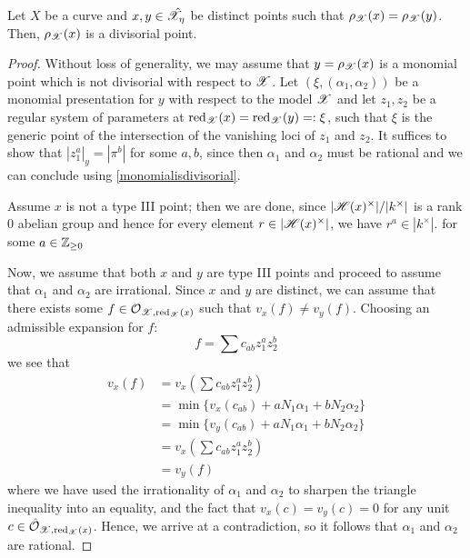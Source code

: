 \begin{prop}\label{lemma:retractiondivisorial}
    Let $X$ be a curve and $x, y \in \hat{\mathscr{X}}_{\eta}$ be distinct points such that $\rho_{\mathscr{X}}(x) = \rho_{\mathscr{X}}(y)$. 
    Then, $\rho_{\mathscr{X}}(x)$ is a divisorial point.
\end{prop}
\begin{proof}
    Without loss of generality, we may assume that $y = \rho_{\mathscr{X}}(x)$ is a monomial point which is not divisorial with respect to $\mathscr{X}$.
    Let $(\xi, (\alpha_1, \alpha_2))$ be a monomial presentation for $y$ with respect to the model $\mathscr{X}$ and let $z_1, z_2$ be a regular system of parameters at $\operatorname{red}_{\mathscr{X}}(x) = \operatorname{red}_{\mathscr{X}}(y) =: \xi$, such that $\xi$ is the generic point of the intersection of the vanishing loci of $z_1$ and $z_2$. 
    It suffices to show that $|z_1^a|_y = |\pi^b|$ for some $a, b$, since then $\alpha_1$ and $\alpha_2$ must be rational and we can conclude using \cref{monomialisdivisorial}.
    
    Assume $x$ is not a type III point; then we are done, since $|\mathscr{H}(x)^{\times}|/|k^{\times}|$ is a rank $0$ abelian group and hence for every element $r \in |\mathscr{H}(x)^{\times}|$, we have $r^a \in |k^{\times}|$. for some $a \in \mathbb{Z}_{\geq 0}$
    
    Now, we assume that both $x$ and $y$ are type III points and proceed to assume that $\alpha_1$ and $\alpha_2$ are irrational.
    Since $x$ and $y$ are distinct, we can assume that there exists some $f \in \mathcal{O}_{\mathscr{X}, \operatorname{red}_{\mathscr{X}}(x)}$ such that $v_x(f) \neq v_y(f)$. 
    Choosing an admissible expansion for $f$:
    \[
        f = \sum c_{ab} z_1^{a} z_2^{b}
    \]
    we see that
    \begin{align*}
        v_x(f) &= v_x \left(\sum c_{ab} z_1^{a} z_2^{b} \right) \\
              &= \min \{ v_x(c_{ab}) + aN_1 \alpha_1 + bN_2 \alpha_2 \} \\
              &= \min \{ v_y(c_{ab}) + aN_1 \alpha_1 + bN_2 \alpha_2 \} \\
              &= v_x \left(\sum c_{ab} z_1^{a} z_2^{b} \right) \\
              & = v_y(f)
    \end{align*}
    where we have used the irrationality of $\alpha_1$ and $\alpha_2$ to sharpen the triangle inequality into an equality, and the fact that $v_x(c) = v_y(c) = 0$ for any unit $c \in \hat{\mathcal{O}}_{\mathscr{X}, \operatorname{red}_{\mathscr{X}}(x)}$.
    Hence, we arrive at a contradiction, so it follows that $\alpha_1$ and $\alpha_2$ are rational. 
\end{proof}

